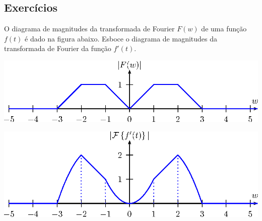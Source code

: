 \subsection*{Exercícios}
\begin{exer}O diagrama de magnitudes da transformada de Fourier $F(w)$ de uma função $f(t)$ é dado na figura abaixo. Esboce o diagrama de magnitudes da transformada de Fourier da função $f'(t)$. 
\newpage
    \begin{center}
\includegraphics{cap_propriedades_transformada/pics/figura_1}
    \end{center}
 
\end{exer}
\begin{resp}
    \includegraphics{cap_propriedades_transformada/pics/figura_1b}
\end{resp}

